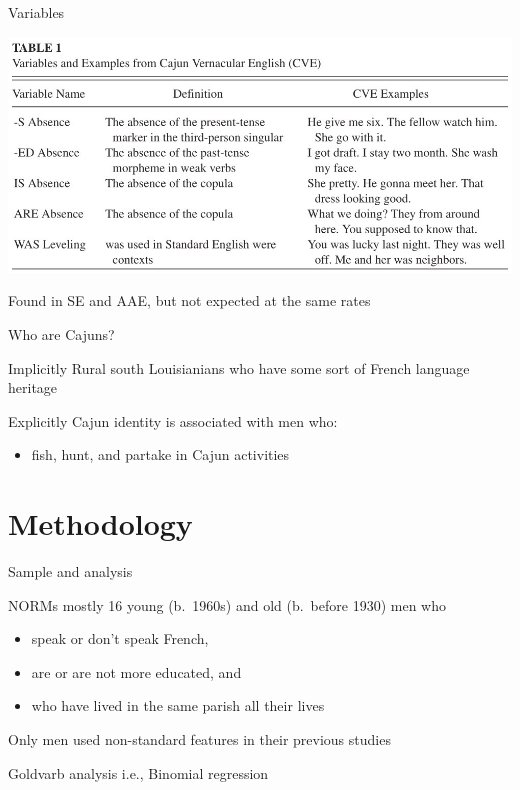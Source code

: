 \documentclass{beamer}
\begin{document}
    \begin{frame}{Variables}
      \begin{center}
        \includegraphics[scale=0.65]{variables.jpg}
      \end{center}
      \begin{block}{}
        Found in SE and AAE, but not expected at the same rates
      \end{block}
    \end{frame}

    \begin{frame}{Who are Cajuns?}
      \begin{block}{Implicitly}
        Rural south Louisianians who have some sort of French language heritage
      \end{block}
      \begin{block}{Explicitly}
        Cajun identity is associated with men who:
        \begin{itemize}
          \item fish, hunt, and partake in Cajun activities
        \end{itemize}
      \end{block}
    \end{frame}

  \section{Methodology}
    \begin{frame}{Sample and analysis}
      \begin{block}{NORMs mostly}
        16 young (b.~1960s) and old (b.~before 1930) men who
        \begin{itemize}
          \item speak or don't speak French,
          \item are or are not more educated, and
          \item who have lived in the same parish all their lives
        \end{itemize}
      \end{block}
      \begin{alertblock}{}
        Only men used non-standard features in their previous studies
      \end{alertblock}
      \begin{block}{Goldvarb analysis}
        i.e., Binomial regression
      \end{block}
    \end{frame}
\end{document}
